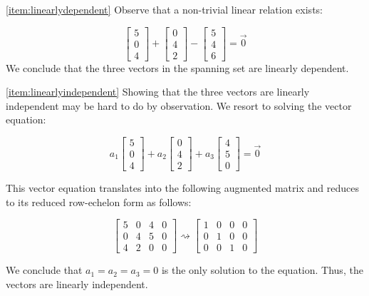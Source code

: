 \documentclass{ximera}
\begin{document}
\begin{example}
\begin{explanation}
\ref{item:linearlydependent} Observe that a non-trivial linear relation exists:

$$\begin{bmatrix}5\\0\\4\end{bmatrix}+ \begin{bmatrix}0\\4\\2\end{bmatrix}-\begin{bmatrix}5\\4\\6\end{bmatrix}=\vec{0}$$
We conclude that the three vectors in the spanning set are linearly dependent.

\ref{item:linearlyindependent}
Showing that the three vectors are linearly independent may be hard to do by observation.  We resort to solving the vector equation:

$$a_1\begin{bmatrix}5\\0\\4\end{bmatrix}+ a_2\begin{bmatrix}0\\4\\2\end{bmatrix}+a_3\begin{bmatrix}4\\5\\0\end{bmatrix}=\vec{0}$$

This vector equation translates into the following augmented matrix and reduces to its reduced row-echelon form as follows:

$$\left[\begin{array}{ccc|c}  
 5&0&4&0\\0&4&5&0\\4&2&0&0
 \end{array}\right]\rightsquigarrow\left[\begin{array}{ccc|c}  
 1&0&0&0\\0&1&0&0\\0&0&1&0
 \end{array}\right]$$
 
 We conclude that $a_1=a_2=a_3=0$ is the only solution to the equation.  Thus, the vectors are linearly independent.
\end{explanation}
\end{example}
\end{document}
